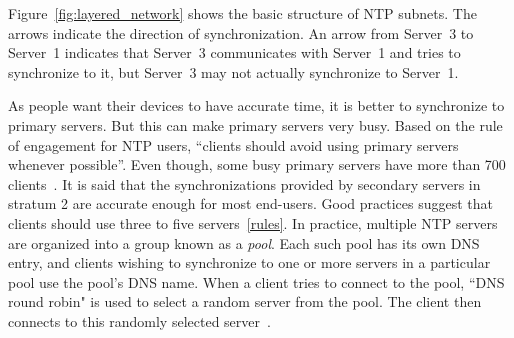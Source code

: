 Figure~\ref{fig:layered_network} shows the basic structure of NTP subnets. The
arrows indicate the direction of synchronization. An arrow from Server~3 to
Server~1 indicates that Server~3 communicates with Server~1 and tries to
synchronize to it, but Server~3 may not actually synchronize to Server~1.



As people want their devices to have accurate time, it is better to synchronize to
primary servers. But this can make primary servers very busy. Based on the rule
of engagement for NTP users, ``clients should avoid using primary servers
whenever possible''. Even though, some busy primary servers have more than 700
clients~\cite{rules}. 
It is said that the synchronizations provided by secondary servers in stratum 2
are accurate enough for most end-users. Good practices suggest that clients
should use three to five servers~\ref{rules}. 
In practice, multiple NTP servers are organized into a group known as a
\emph{pool}. Each such pool has its own DNS entry, and clients wishing to
synchronize to one or more servers in a particular pool use the pool's DNS
name. When a client tries to connect to the pool, ``DNS round robin" is used to
select a random server from the pool. The client then connects to this randomly
selected server~\cite{pool}.


